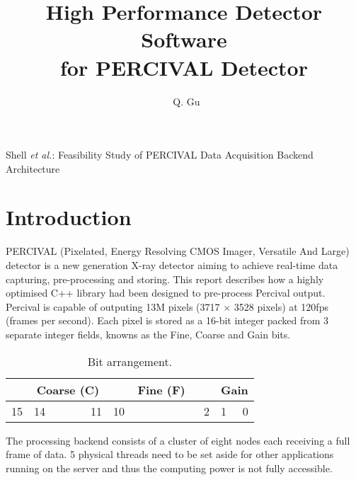 \documentclass[journal]{IEEEtran}
\begin{document}
\title{High Performance Detector Software\\
for PERCIVAL Detector}

\author{~Q. Gu}

%
{Shell \MakeLowercase{\textit{et al.}}: Feasibility Study of PERCIVAL Data
Acquisition Backend Architecture}

\maketitle

\begin{abstract}

\end{abstract}

\section{Introduction}

 PERCIVAL\cite{wunderer2014percival} (Pixelated, Energy Resolving CMOS Imager, Versatile And Large) detector is a new generation X-ray detector aiming to achieve real-time data capturing, pre-processing and storing. This report describes how a highly optimised C++ library had been designed to pre-process Percival output. \\ 
Percival is capable of outputing \texttildelow 13M pixels (3717 $\times$ 3528 pixels) at 120fps (frames per second). Each pixel is stored as a 16-bit integer packed from 3 separate integer fields, knowns as the Fine, Coarse and Gain bits. 

\begin{table}[h]
\centering
\label{bit_arrangement}
\begin{tabular}{r l c c c r l c c c c c c  r l r}
\hline
\multicolumn{1}{|c|}{} & 
\multicolumn{5}{|c|}{Coarse (C)} & 
\multicolumn{8}{|c|}{Fine (F)} &
\multicolumn{2}{|c|}{Gain} \\
\hline
 15 & 14 & & & & 11 & 10 & & & & & & & 2 & 1 & 0 \\
\end{tabular}
\caption{Bit arrangement.}
\end{table}

The processing backend consists of a cluster of eight nodes each receiving a full frame of data. 5 physical threads need to be set aside for other applications running on the server and thus the computing power is not fully accessible.
\end{document}
